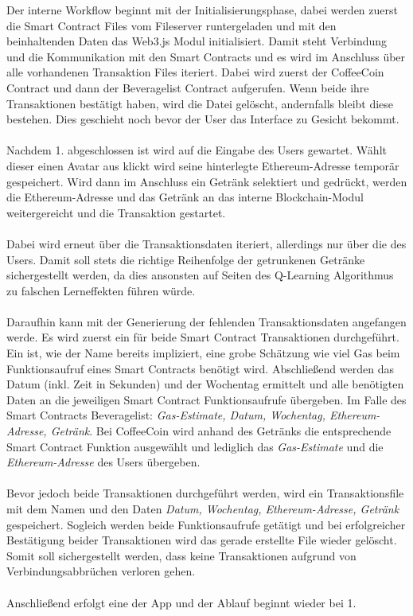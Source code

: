 Der interne Workflow beginnt mit der Initialisierungsphase, dabei werden zuerst die Smart Contract Files vom Fileserver runtergeladen und mit den beinhaltenden Daten das Web3.js Modul initialisiert. Damit steht Verbindung und die Kommunikation mit den Smart Contracts und es wird im Anschluss über alle vorhandenen Transaktion Files iteriert. Dabei wird zuerst der CoffeeCoin Contract und dann der Beveragelist Contract aufgerufen. Wenn beide ihre Transaktionen bestätigt haben, wird die Datei gelöscht, andernfalls bleibt diese bestehen. Dies geschieht noch bevor der User das Interface zu Gesicht bekommt.\\\\
Nachdem 1. abgeschlossen ist wird auf die Eingabe des Users gewartet. Wählt dieser einen Avatar aus klickt  wird seine hinterlegte Ethereum-Adresse temporär gespeichert. Wird dann im Anschluss ein Getränk selektiert und  gedrückt, werden die Ethereum-Adresse und das Getränk an das interne Blockchain-Modul weitergereicht und die Transaktion gestartet. \\\\
Dabei wird erneut über die Transaktionsdaten iteriert, allerdings nur über die des Users. Damit soll stets die richtige Reihenfolge der getrunkenen Getränke sichergestellt werden, da dies ansonsten auf Seiten des Q-Learning Algorithmus zu falschen Lerneffekten führen würde.\\\\
Daraufhin kann mit der Generierung der fehlenden Transaktionsdaten angefangen werde. Es wird zuerst ein  für beide Smart Contract Transaktionen durchgeführt. Ein  ist, wie der Name bereits impliziert, eine grobe Schätzung wie viel Gas beim Funktionsaufruf eines Smart Contracts benötigt wird. Abschließend werden das Datum (inkl. Zeit in Sekunden) und der Wochentag ermittelt und alle benötigten Daten an die jeweiligen Smart Contract Funktionsaufrufe übergeben. Im Falle des Smart Contracts Beveragelist: \textit{Gas-Estimate, Datum, Wochentag, Ethereum-Adresse, Getränk}.
Bei CoffeeCoin wird anhand des Getränks die entsprechende Smart Contract Funktion ausgewählt und lediglich das \textit{Gas-Estimate} und die \textit{Ethereum-Adresse} des Users übergeben.\\\\
Bevor jedoch beide Transaktionen durchgeführt werden, wird ein Transaktionsfile mit dem Namen  und den Daten \textit{Datum, Wochentag, Ethereum-Adresse, Getränk} gespeichert. Sogleich werden beide Funktionsaufrufe getätigt und bei erfolgreicher Bestätigung beider Transaktionen wird das gerade erstellte File wieder gelöscht. Somit soll sichergestellt werden, dass keine Transaktionen aufgrund von Verbindungsabbrüchen verloren gehen. \\\\
Anschließend erfolgt eine  der App und der Ablauf beginnt wieder bei 1.